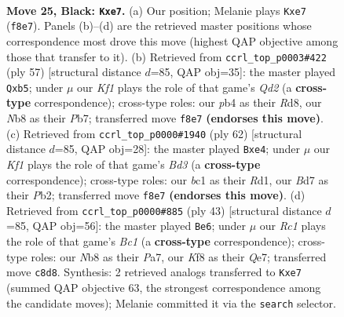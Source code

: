 \documentclass[11pt]{article}
\begin{document}
\clearpage

\begin{figure}[p]\centering
\begin{subfigure}{0.46\textwidth}\centering
\resizebox{\linewidth}{!}{%
\newchessgame
\chessboard[
  setfen={rnr2k2/pppbN3/q4p2/P2p4/1P1P4/4P1P1/3Q4/RNB2RK1 b - - 0 25},
  showmover=false,
  pgfstyle=straightmove, color=movearrow, markmove={f8-e7}
]}
\caption{}
\end{subfigure}\hfill
\begin{subfigure}{0.46\textwidth}\centering
\resizebox{\linewidth}{!}{%
\newchessgame
\chessboard[
  setfen={r2r2k1/1p1q1pb1/5n1p/1N2P1p1/1B6/pQ2PP1P/P5P1/R1R3K1 b - - 0 29},
  showmover=false,
  pgfstyle=straightmove, color=movearrow, markmove={d7-b5}
]}
\caption{}
\end{subfigure}
\\[4pt]
\begin{subfigure}{0.46\textwidth}\centering
\resizebox{\linewidth}{!}{%
\newchessgame
\chessboard[
  setfen={4qrnk/r6p/p3p1p1/3p4/P2Pn1P1/1N1B3Q/1P3P2/1K1R3R w - - 1 32},
  showmover=false,
  pgfstyle=straightmove, color=movearrow, markmove={d3-e4}
]}
\caption{}
\end{subfigure}\hfill
\begin{subfigure}{0.46\textwidth}\centering
\resizebox{\linewidth}{!}{%
\newchessgame
\chessboard[
  setfen={r1b2k2/pp2q2r/2pN1pR1/2n5/1bP2Q2/8/PP3P1P/2KR1B2 b - - 0 22},
  showmover=false,
  pgfstyle=straightmove, color=movearrow, markmove={c8-e6}
]}
\caption{}
\end{subfigure}
\caption{\textbf{Move 25, Black: \texttt{Kxe7}.} (a) Our position; Melanie plays \texttt{Kxe7} (\texttt{f8e7}). Panels (b)--(d) are the retrieved master positions whose correspondence most drove this move (highest QAP objective among those that transfer to it). (b) Retrieved from \texttt{ccrl\_top\_p0003\#422} (ply 57) [structural distance $d$=85, QAP obj=35]: the master played \texttt{Qxb5}; under $\mu$ our \emph{Kf1} plays the role of that game's \emph{Qd2} (a \textbf{cross-type} correspondence); cross-type roles: our \emph{p}b4 as their \emph{R}d8, our \emph{N}b8 as their \emph{P}b7; transferred move \texttt{f8e7} \textbf{(endorses this move)}. (c) Retrieved from \texttt{ccrl\_top\_p0000\#1940} (ply 62) [structural distance $d$=85, QAP obj=28]: the master played \texttt{Bxe4}; under $\mu$ our \emph{Kf1} plays the role of that game's \emph{Bd3} (a \textbf{cross-type} correspondence); cross-type roles: our \emph{b}c1 as their \emph{R}d1, our \emph{B}d7 as their \emph{P}b2; transferred move \texttt{f8e7} \textbf{(endorses this move)}. (d) Retrieved from \texttt{ccrl\_top\_p0000\#885} (ply 43) [structural distance $d$=85, QAP obj=56]: the master played \texttt{Be6}; under $\mu$ our \emph{Rc1} plays the role of that game's \emph{Bc1} (a \textbf{cross-type} correspondence); cross-type roles: our \emph{N}b8 as their \emph{P}a7, our \emph{K}f8 as their \emph{Q}e7; transferred move \texttt{c8d8}. Synthesis: 2 retrieved analogs transferred to \texttt{Kxe7} (summed QAP objective 63, the strongest correspondence among the candidate moves); Melanie committed it via the \texttt{search} selector.}
\label{fig:thought-m49}
\end{figure}
\end{document}
